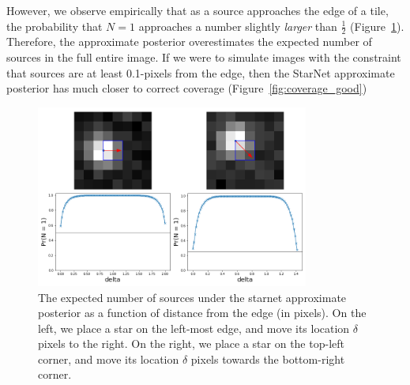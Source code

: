 However, we observe empirically that as a source approaches the edge of a tile,
the probability that $N = 1$ approaches a number
slightly \textit{larger} than $\frac{1}{2}$ (Figure~\ref{fig:starnet_edges}).
Therefore, the approximate posterior overestimates the expected number of sources in the full entire image.
If we were to simulate images with the constraint that sources are at least 0.1-pixels from the edge,
then the StarNet approximate posterior has much closer to correct coverage (Figure~\ref{fig:coverage_good})

\begin{figure}[tb]
    \centering
    \includegraphics[width=0.8\textwidth]{./figures/coverage/edges_example.png}
    \vspace{-0.4cm}
    \caption{The expected number of sources under the starnet approximate posterior as a function of distance from the edge (in pixels).
    On the left, we place a star on the left-most edge, and move its location $\delta$ pixels to the right.
    On the right, we place a star on the top-left corner, and move its location $\delta$ pixels towards the bottom-right corner.}
    \label{fig:starnet_edges}
\end{figure}

